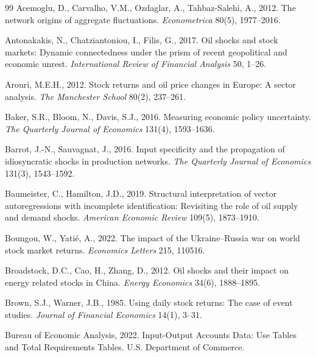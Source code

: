 \documentclass[12pt,preprint,authoryear]{elsarticle}
\begin{document}
\begin{thebibliography}{99}
Acemoglu, D., Carvalho, V.M., Ozdaglar, A., Tahbaz-Salehi, A., 2012. The network origins of aggregate fluctuations. \textit{Econometrica} 80(5), 1977--2016.

Antonakakis, N., Chatziantoniou, I., Filis, G., 2017. Oil shocks and stock markets: Dynamic connectedness under the prism of recent geopolitical and economic unrest. \textit{International Review of Financial Analysis} 50, 1--26.

Arouri, M.E.H., 2012. Stock returns and oil price changes in Europe: A sector analysis. \textit{The Manchester School} 80(2), 237--261.

Baker, S.R., Bloom, N., Davis, S.J., 2016. Measuring economic policy uncertainty. \textit{The Quarterly Journal of Economics} 131(4), 1593--1636.

Barrot, J.-N., Sauvagnat, J., 2016. Input specificity and the propagation of idiosyncratic shocks in production networks. \textit{The Quarterly Journal of Economics} 131(3), 1543--1592.

Baumeister, C., Hamilton, J.D., 2019. Structural interpretation of vector autoregressions with incomplete identification: Revisiting the role of oil supply and demand shocks. \textit{American Economic Review} 109(5), 1873--1910.

Boungou, W., Yati\'{e}, A., 2022. The impact of the Ukraine--Russia war on world stock market returns. \textit{Economics Letters} 215, 110516.

Broadstock, D.C., Cao, H., Zhang, D., 2012. Oil shocks and their impact on energy related stocks in China. \textit{Energy Economics} 34(6), 1888--1895.

Brown, S.J., Warner, J.B., 1985. Using daily stock returns: The case of event studies. \textit{Journal of Financial Economics} 14(1), 3--31.

{Bureau of Economic Analysis}, 2022. Input-Output Accounts Data: Use Tables and Total Requirements Tables. U.S. Department of Commerce.


\end{thebibliography}
\end{document}
